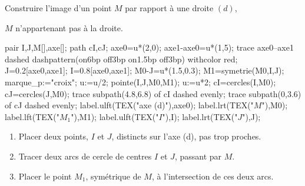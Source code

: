 \begin{methode*1}    
    \exercice
    Construire l'image d'un point $M$ par rapport à une droite $(d)$,
    
    $M$ n'appartenant pas à la droite.
    \correction
    \begin{minipage}{0.35\linewidth}
        \begin{center}
            \begin{Geometrie}
                pair I,J,M[],axe[];
                path cI,cJ;
                axe0=u*(2,0);
                axe1-axe0=u*(1,5);                
                trace axe0--axe1 dashed dashpattern(on6bp off3bp on1.5bp off3bp) withcolor red;
                J=0.2[axe0,axe1];
                I=0.8[axe0,axe1];
                M0-J=u*(1.5,0.3);
                M1=symetrie(M0,I,J);
                marque_p:="croix";
                u:=u/2;
                pointe(I,J,M0,M1);
                u:=u*2;
                cI=cercles(I,M0);
                cJ=cercles(J,M0);
                trace subpath(4.8,6.8) of cI dashed evenly;
                trace subpath(0,3.6) of cJ dashed evenly;
                label.ulft(TEX("axe (d)"),axe0);
                label.lrt(TEX("$M$"),M0);
                label.lft(TEX("$M_1$"),M1);
                label.ulft(TEX("$I$"),I);
                label.lrt(TEX("$J$"),J);
            \end{Geometrie}
        \end{center}
    \end{minipage}
    \begin{minipage}{0.65\linewidth}
        \begin{enumerate}
            \item Placer deux points, $I$ et $J$, distincts sur l’axe (d), pas trop proches.
            \item Tracer deux arcs de cercle de centres $I$ et $J$, passant par $M$.
            \item Placer le point $M_1$, symétrique de $M$, à l’intersection de ces deux arcs.
        \end{enumerate}
    \end{minipage}
    \begin{myBox}{}
        \begin{minipage}{\linewidth}

            \creditInstrumentPoche
        \end{minipage}
    \end{myBox}
\end{methode*1}

 
